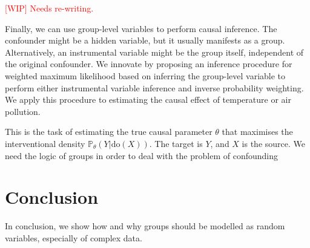 \documentclass[backrefs]{cam-thesis}
\newcommand{\crit}[1]{\textcolor{red}{#1}}
\begin{document}
\crit{[WIP] Needs re-writing.}

Finally, we can use group-level variables to perform causal inference. The confounder might be a hidden variable, but it usually manifests as a group. Alternatively, an instrumental variable might be the group itself, independent of the original confounder. We innovate by proposing an inference procedure for weighted maximum likelihood based on inferring the group-level variable to perform either instrumental variable inference and inverse probability weighting. We apply this procedure to estimating the causal effect of temperature or air pollution.

This is the task of estimating the true causal parameter $\theta$ that maximises the interventional density $\mathbb{P}_{\theta} (Y | \mathrm{do} (X))$. The target is $Y$, and $X$ is the source. We need the logic of groups in order to deal with the problem of confounding

\chapter{Conclusion}

In conclusion, we show how and why groups should be modelled as random variables, especially of complex data.


%

\renewcommand{\bibname}{References}
\cleardoublepage
{}
{}





\end{document}
